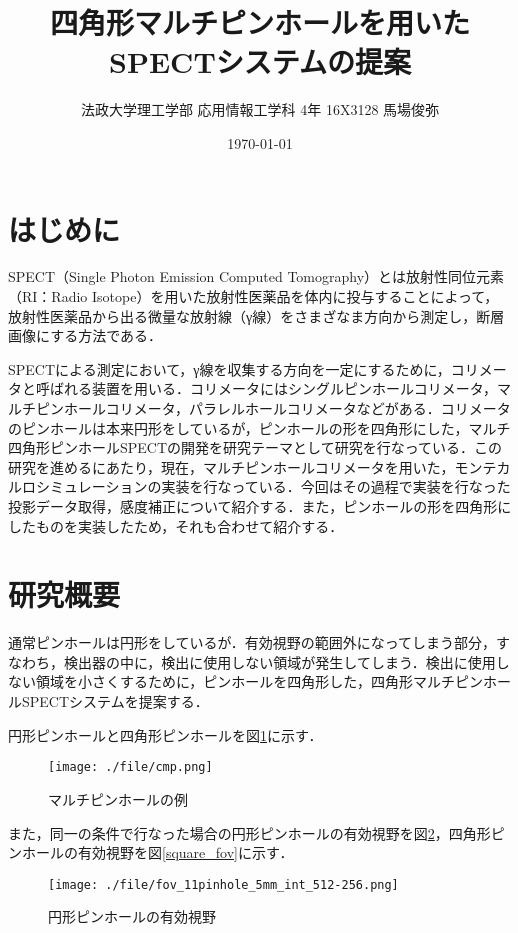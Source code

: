 \documentclass[dvipdfmx,autodetect-engine,twocolumn,10pt]{jsarticle}%
\title{四角形マルチピンホールを用いたSPECTシステムの提案}
\author{法政大学理工学部 応用情報工学科 4年 16X3128 馬場俊弥}
\date{\today}
\begin{document}
\maketitle
\section{はじめに}
SPECT（Single Photon Emission Computed Tomography）とは放射性同位元素（RI：Radio Isotope）を用いた放射性医薬品を体内に投与することによって，放射性医薬品から出る微量な放射線（γ線）をさまざなま方向から測定し，断層画像にする方法である．

SPECTによる測定において，γ線を収集する方向を一定にするために，コリメータと呼ばれる装置を用いる．コリメータにはシングルピンホールコリメータ，マルチピンホールコリメータ，パラレルホールコリメータなどがある．コリメータのピンホールは本来円形をしているが，ピンホールの形を四角形にした，マルチ四角形ピンホールSPECTの開発を研究テーマとして研究を行なっている．この研究を進めるにあたり，現在，マルチピンホールコリメータを用いた，モンテカルロシミュレーションの実装を行なっている．今回はその過程で実装を行なった投影データ取得，感度補正について紹介する．また，ピンホールの形を四角形にしたものを実装したため，それも合わせて紹介する．



\section{研究概要}
通常ピンホールは円形をしているが．有効視野の範囲外になってしまう部分，すなわち，検出器の中に，検出に使用しない領域が発生してしまう．検出に使用しない領域を小さくするために，ピンホールを四角形した，四角形マルチピンホールSPECTシステムを提案する．

円形ピンホールと四角形ピンホールを図\ref{cmp_pinhole}に示す．

\begin{figure}[htbp]
  \begin{center}
    \texttt{[image: ./file/cmp.png]}\\
    \caption{マルチピンホールの例}
    \label{cmp_pinhole}
  \end{center}
\end{figure}


また，同一の条件で行なった場合の円形ピンホールの有効視野を図\ref{circle_fov}，四角形ピンホールの有効視野を図\ref{square_fov}に示す．

\begin{figure}[htbp]
  \begin{center}
    \texttt{[image: ./file/fov\_11pinhole\_5mm\_int\_512-256.png]}\\
    \caption{円形ピンホールの有効視野}
    \label{circle_fov}
  \end{center}
\end{figure}
\end{document}
